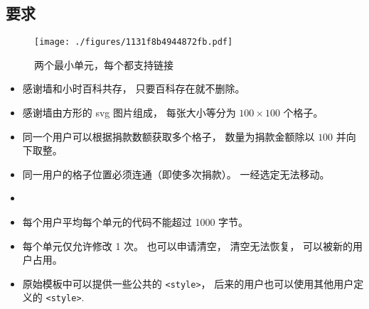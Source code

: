 
\subsection{要求}

\begin{figure}[ht]
\centering
\texttt{[image: ./figures/1131f8b4944872fb.pdf]}
\caption{两个最小单元，每个都支持链接} \label{fig_thanks_1}
\end{figure}

\begin{itemize}
\item 感谢墙和小时百科共存， 只要百科存在就不删除。
\item 感谢墙由方形的 svg 图片组成， 每张大小等分为 $100\times 100$ 个格子。
\item 同一个用户可以根据捐款数额获取多个格子， 数量为捐款金额除以 $100$ 并向下取整。
\item 同一用户的格子位置必须连通（即使多次捐款）。 一经选定无法移动。
\item 
\item 每个用户平均每个单元的代码不能超过 1000 字节。
\item 每个单元仅允许修改 1 次。 也可以申请清空， 清空无法恢复， 可以被新的用户占用。
\item 原始模板中可以提供一些公共的 \verb`<style>`， 后来的用户也可以使用其他用户定义的 \verb`<style>`.
\end{itemize}

